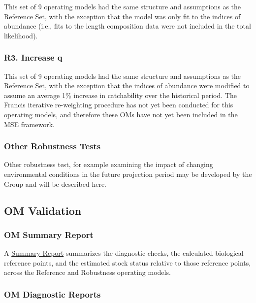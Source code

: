 \documentclass[
]{article}
\begin{document}
This set of 9 operating models had the same structure and assumptions as the Reference Set, with the exception that the model was only fit to the indices of abundance (i.e., fits to the length composition data were not included in the total likelihood).

\hypertarget{r3.-increase-q}{%
\subsubsection{R3. Increase q}\label{r3.-increase-q}}

This set of 9 operating models had the same structure and assumptions as the Reference Set, with the exception that the indices of abundance were modified to assume an average 1\% increase in catchability over the historical period. The Francis iterative re-weighting procedure has not yet been conducted for this operating models, and therefore these OMs have not yet been included in the MSE framework.

\hypertarget{other-robustness-tests}{%
\subsubsection{Other Robustness Tests}\label{other-robustness-tests}}

Other robustness test, for example examining the impact of changing environmental conditions in the future projection period may be developed by the Group and will be described here.

\hypertarget{om-validation}{%
\subsection{OM Validation}\label{om-validation}}

\hypertarget{om-summary-report}{%
\subsubsection{OM Summary Report}\label{om-summary-report}}

A \href{../Reports/OM_Summary/2022/OM_Summary_Report.html}{Summary Report} summarizes the diagnostic checks, the calculated biological reference points, and the estimated stock status relative to those reference points, across the Reference and Robustness operating models.

\hypertarget{om-diagnostic-reports}{%
\subsubsection{OM Diagnostic Reports}\label{om-diagnostic-reports}}
\end{document}
